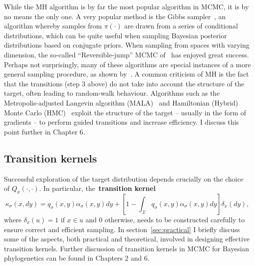 While the MH algorithm is by far the most popular algorithm in MCMC, it is by no means the only one.
A very popular method is the Gibbs sampler~\citep{Geman1984}, an algorithm whereby samples from $\pi(\cdot)$ are drawn from a series of conditional distributions, which can be quite useful when sampling Bayesian posterior distributions based on conjugate priors.
When sampling from spaces with varying dimension, the so-called ``Reversible-jump'' MCMC of~\cite{Green1995} has enjoyed great success.
Perhaps not surprisingly, many of these algorithms are special instances of a more general sampling procedure, as shown by~\cite{Keith2004}.
A common criticism of MH is the fact that the transitions (step 3 above) do not take into account the structure of the target, often leading to random-walk behaviour.
Algorithms such as the Metropolis-adjusted Langevin algorithm (MALA)~\citep{Roberts1998} and Hamiltonian (Hybrid) Monte Carlo (HMC)~\citep{Duane1987,Neal2011} exploit the structure of the target -- usually in the form of gradients -- to perform guided transitions and increase efficiency.
I discuss this point further in Chapter 6.

\subsection{Transition kernels}
\label{sec:kernels}

Successful exploration of the target distribution depends crucially on the choice of $Q_\sigma(\cdot, \cdot)$.
In particular, the~\textbf{transition kernel}
\begin{equation}
 \label{eq:transition_kernel}
 \kappa_\sigma(x, dy) = q_\sigma(x, y) \alpha_\sigma(x,y)dy  + \left[1 - \int_{\mathcal{X}} q_\sigma(x, y) \alpha_\sigma(x,y)dy \right]\delta_x(dy),
\end{equation}
where $\delta_x(u) = 1$ if $x \in u$ and $0$ otherwise, needs to be constructed carefully to ensure correct and efficient sampling.
In section~\ref{sec:practical} I briefly discuss some of the aspects, both practical and theoretical, involved in designing effective transition kernels.
Further discussion of transition kernels in MCMC for Bayesian phylogenetics can be found in Chapters 2 and 6.

